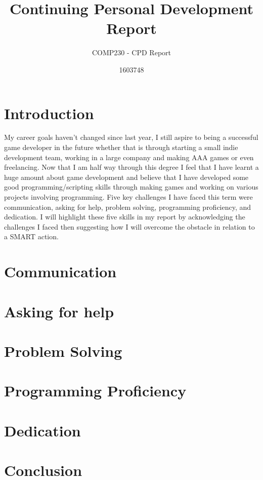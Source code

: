 \documentclass{scrartcl}
\title{Continuing Personal Development Report}
\subtitle{COMP230 - CPD Report}
\author{1603748}
\begin{document}
\maketitle

\section*{Introduction}


My career goals haven't changed since last year, I still aspire to being a successful game developer in the future whether that is through starting a small indie development team, working in a large company and making AAA games or even freelancing. Now that I am half way through this degree I feel that I have learnt a huge amount about game development and believe that I have developed some good programming/scripting skills through making games and working on various projects involving programming. Five key challenges I have faced this term were communication, asking for help, problem solving, programming proficiency, and dedication. I will highlight these five skills in my report by acknowledging the challenges I faced then suggesting how I will overcome the obstacle in relation to a SMART action.

\section{Communication}


\section{Asking for help}


\section{Problem Solving}


\section{Programming Proficiency}


\section{Dedication}


\section*{Conclusion}




\end{document}
